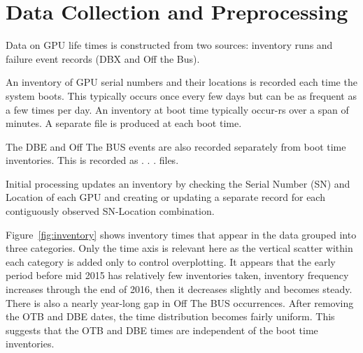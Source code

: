 \section{Data Collection and Preprocessing}
\label{sec:data}
Data on GPU life times is constructed from two sources: inventory runs
and failure event records (DBX and Off the Bus).

An inventory of GPU serial numbers and their locations is recorded
each time the system boots. This typically occurs once every few days but
can be as frequent as a few times per day. An inventory at boot time
typically occur-rs over a span of  minutes. A separate file is
produced at each boot time.

The DBE and Off The BUS events are also recorded separately from boot
time inventories. This is recorded as . . . files.

Initial processing updates an inventory by checking the Serial Number
(SN) and Location of each GPU and creating or updating a separate
record for each contiguously observed SN-Location combination.

Figure~\ref{fig:inventory} shows inventory times that appear in the
data grouped into three categories. Only the time axis is relevant
here as the vertical scatter within each category is added only to
control overplotting. It appears that the early period before mid 2015
has relatively few inventories taken, inventory frequency increases
through the end of 2016, then it decreases slightly and becomes
steady. There is also a nearly year-long gap in Off The BUS
occurrences. After removing the OTB and DBE dates, the time
distribution becomes fairly uniform. This suggests that the OTB and
DBE times are independent of the boot time inventories.


